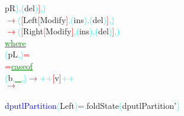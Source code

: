 {{{\rm{}pR}\textcolor{cyan}{)}\textcolor{cyan}{,}\hsspace \hsspace \textcolor{cyan}{(}{\rm{}del}\textcolor{cyan}{)}\textcolor{red}{]}\textcolor{cyan}{,}\textcolor{cyan}{)}\\\hsspace \textcolor{red}{\ensuremath{\rightarrow}}\hsspace \textcolor{cyan}{(}\textcolor{red}{[}{\rm{}Left}\hsspace \hsspace \textcolor{red}{[}{\rm{}Modify}\textcolor{red}{]}\textcolor{cyan}{,}\hsspace \hsspace \textcolor{cyan}{(}{\rm{}ins}\textcolor{cyan}{)}\textcolor{cyan}{,}\hsspace \textcolor{cyan}{(}{\rm{}del}\textcolor{cyan}{)}\textcolor{red}{]}\textcolor{cyan}{,}\textcolor{cyan}{)}\\\hsspace \textcolor{red}{\ensuremath{\rightarrow}}\hsspace \textcolor{cyan}{(}\textcolor{red}{[}{\rm{}Right}\hsspace \textcolor{red}{[}{\rm{}Modify}\textcolor{red}{]}\textcolor{cyan}{,}\hsspace \textcolor{cyan}{(}{\rm{}ins}\textcolor{cyan}{)}\textcolor{cyan}{,}\hsspace \textcolor{cyan}{(}{\rm{}del}\textcolor{cyan}{)}\textcolor{red}{]}\textcolor{cyan}{,}\textcolor{cyan}{)}\\\hstab \textcolor{green}{\underline{where}}\\\hstab \textcolor{cyan}{(}{\rm{}pL}\textcolor{cyan}{,}\textcolor{cyan}{)}\hsspace \textcolor{red}{=}\\\hsspace \hsspace \hsspace \hsspace \textcolor{red}{=}\hsspace \textcolor{green}{\underline{case}}\hsspace \textcolor{green}{\underline{of}}\\\hstab {}\hsspace \textcolor{cyan}{(}{\rm{}b}\textcolor{cyan}{,}\hsspace \textcolor{green}{\underline{\_}}\textcolor{cyan}{,}\textcolor{cyan}{)}\hsspace \textcolor{red}{\ensuremath{\rightarrow}}\hsspace \textcolor{cyan}{++}\hsspace \textcolor{red}{[}{\rm{}v}\textcolor{red}{]}\hsspace \textcolor{cyan}{++}\\\hstab {}\hsspace \hsspace \hsspace \hsspace \hsspace \hsspace \hsspace \hsspace \textcolor{red}{\ensuremath{\rightarrow}}\\\\\textcolor{blue}{dputlPartition}\hsspace \textcolor{cyan}{(}{\rm{}Left}\hsspace {}\textcolor{cyan}{)}\hsspace \textcolor{red}{=}\textcolor{cyan}{.}{\rm{}foldState}\hsspace \textcolor{cyan}{(}{\rm{}dputlPartition'}\textcolor{cyan}{)}\hsspace }}
